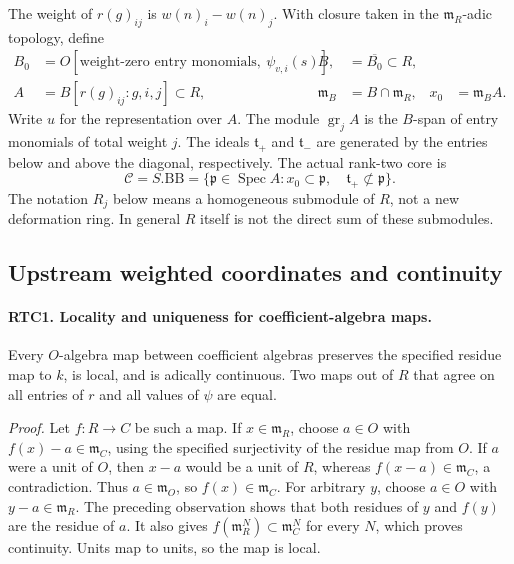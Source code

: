\documentclass[11pt,a4paper]{article}
\numberwithin{equation}{section}
\theoremstyle{remark}\newtheorem{remark}[theorem]{Remark}
\begin{document}
The weight of \(r(g)_{ij}\) is \(w(n)_i-w(n)_j\).
With closure taken in the \(\mathfrak m_R\)-adic topology, define
\[
 \begin{aligned}
 B_0&=O[\text{weight-zero entry monomials},\ \psi_{v,i}(s)],
       &B&=\overline{B_0}\subset R,\\
 A&=B[r(g)_{ij}:g,i,j]\subset R,
       &\mathfrak m_B&=B\cap\mathfrak m_R,
       &x_0&=\mathfrak m_B A.
 \end{aligned}                                             \tag{RTC.4}
\]
Write \(u\) for the representation over \(A\).  The module
\(\operatorname{gr}_j A\) is the \(B\)-span of entry monomials
of total weight \(j\).  The ideals \(\mathfrak t_+\) and
\(\mathfrak t_-\) are generated by the entries below and above
the diagonal, respectively.  The actual rank-two core is
\[
 \mathcal C= S.\mathrm{BB}
 =\{\mathfrak p\in\operatorname{Spec}A:
       x_0\subset\mathfrak p,\quad
       \mathfrak t_+\not\subset\mathfrak p\}.
                                                        \tag{RTC.5}
\]
The notation \(R_j\) below means a homogeneous submodule of \(R\),
not a new deformation ring.  In general \(R\) itself is not the
direct sum of these submodules.

\subsection{Upstream weighted coordinates and continuity}

\paragraph{RTC1. Locality and uniqueness for coefficient-algebra maps.}
\label{claim:RTC1}
Every \(O\)-algebra map between coefficient algebras preserves the
specified residue map to \(k\), is local, and is adically continuous.
Two maps out of \(R\) that agree on all entries of \(r\) and all
values of \(\psi\) are equal.

\emph{Proof.}
Let \(f:R\to C\) be such a map.  If \(x\in\mathfrak m_R\),
choose \(a\in O\) with \(f(x)-a\in\mathfrak m_C\), using the
specified surjectivity of the residue map from \(O\).  If \(a\)
were a unit of \(O\), then \(x-a\) would be a unit of \(R\),
whereas \(f(x-a)\in\mathfrak m_C\), a contradiction.  Thus
\(a\in\mathfrak m_O\), so \(f(x)\in\mathfrak m_C\).
For arbitrary \(y\), choose \(a\in O\) with
\(y-a\in\mathfrak m_R\).  The preceding observation shows that
both residues of \(y\) and \(f(y)\) are the residue of \(a\).
It also gives
\(f(\mathfrak m_R^N)\subset\mathfrak m_C^N\) for every \(N\),
which proves continuity.  Units map to units, so the map is local.
\end{document}
